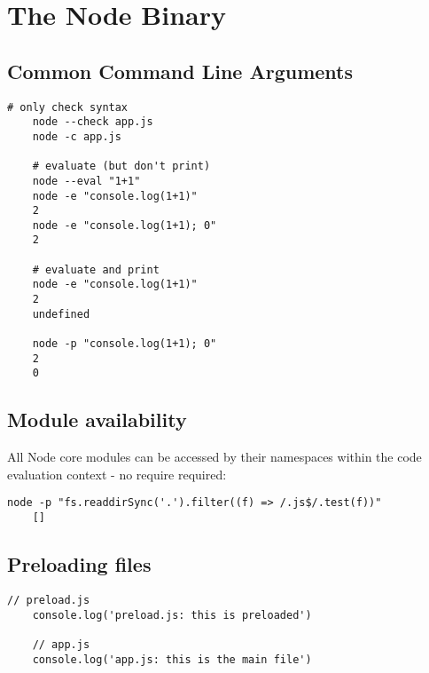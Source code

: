 \documentclass{scrartcl}
\begin{document}




\section{The Node Binary}
\subsection{Common Command Line Arguments}

    \begin{lstlisting}[style=myBash]
    # only check syntax
    node --check app.js
    node -c app.js

    # evaluate (but don't print)
    node --eval "1+1"
    node -e "console.log(1+1)"
    2
    node -e "console.log(1+1); 0"
    2

    # evaluate and print
    node -e "console.log(1+1)"
    2
    undefined

    node -p "console.log(1+1); 0"
    2
    0
    \end{lstlisting}


\subsection{Module availability}

    All Node core modules can be accessed by their namespaces within the code evaluation context - no require required:

    \begin{lstlisting}[style=myBash]
    node -p "fs.readdirSync('.').filter((f) => /.js$/.test(f))"
    []
    \end{lstlisting}

\subsection{Preloading files}

    \begin{lstlisting}[style=ES6]
    // preload.js
    console.log('preload.js: this is preloaded')

    // app.js
    console.log('app.js: this is the main file')
    \end{lstlisting}
\end{document}
